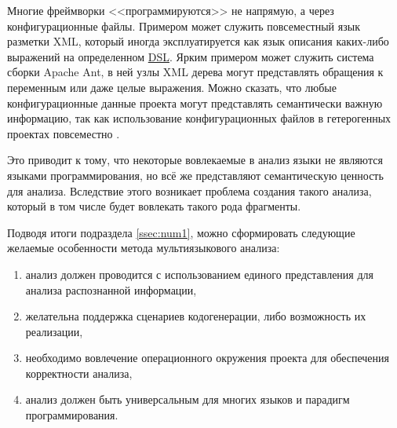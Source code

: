 Многие фреймворки <<программируются>> не напрямую, а через конфигурационные файлы. Примером может служить
повсеместный язык разметки XML, который иногда эксплуатируется как язык описания каких-либо выражений на
определенном \hyperlink{DSL}{DSL}. Ярким примером может служить система сборки Apache Ant, в ней узлы XML дерева
могут представлять обращения к переменным или даже целые выражения. Можно сказать, что любые конфигурационные
данные проекта могут представлять семантически важную информацию, так как использование конфигурационных
файлов в гетерогенных проектах повсеместно \cite{external-dependencies}.

Это приводит к тому, что некоторые вовлекаемые в анализ языки не являются языками программирования, но
всё же представляют семантическую ценность для анализа. Вследствие этого возникает проблема создания
такого анализа, который в том числе будет вовлекать такого рода фрагменты.

Подводя итоги подраздела \ref{ssec:num1}, можно сформировать следующие желаемые
особенности метода мультиязыкового анализа:
\begin{enumerate}[label=\arabic*.]
    \item анализ должен проводится с использованием единого представления для анализа распознанной информации,
    \item желательна поддержка сценариев кодогенерации, либо возможность их реализации,
    \item необходимо вовлечение операционного окружения проекта для обеспечения корректности анализа,
    \item анализ должен быть универсальным для многих языков и парадигм программирования.
\end{enumerate}

\clearpage